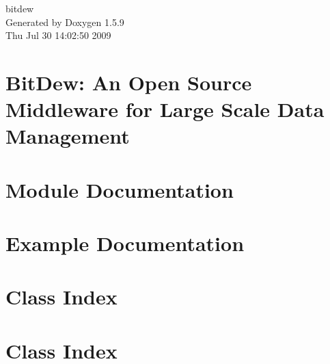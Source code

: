 \documentclass[a4paper]{book}
\begin{document}
\hypersetup{pageanchor=false}
\begin{titlepage}
\vspace*{7cm}
\begin{center}
{\Large bitdew }\\
\vspace*{1cm}
{\large Generated by Doxygen 1.5.9}\\
\vspace*{0.5cm}
{\small Thu Jul 30 14:02:50 2009}\\
\end{center}
\end{titlepage}
\clearemptydoublepage
{}
\tableofcontents
\clearemptydoublepage
{}
\hypersetup{pageanchor=true}
\chapter{BitDew: An Open Source Middleware for Large Scale Data Management}
\label{index}\hypertarget{index}{}
\chapter{Module Documentation}



\chapter{Example Documentation}




\chapter{Class Index}


\chapter{Class Index}

\end{document}
